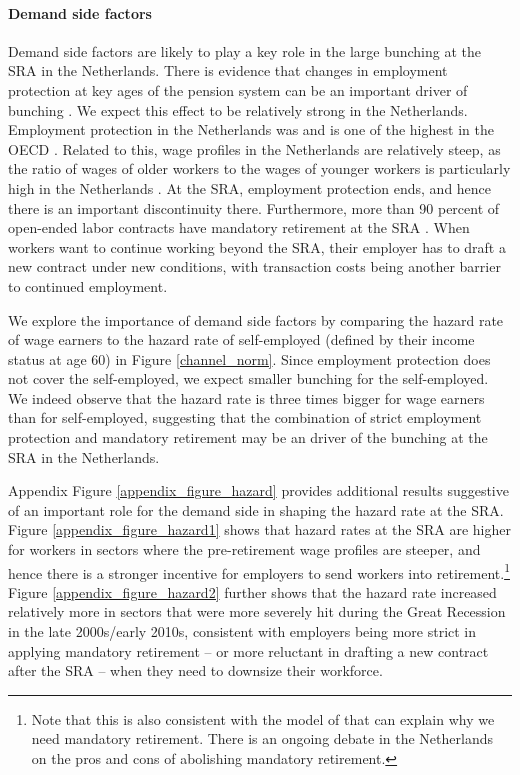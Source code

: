 \documentclass[12pt,a4paper]{article}
\begin{document}
\paragraph{Demand side factors} Demand side factors are likely to play a key role in the large bunching at the SRA in the Netherlands. There is evidence that changes in employment protection at key ages of the pension system can be an important driver of bunching \citep{rabate2019can}. We expect this effect to be relatively strong in the Netherlands. Employment protection in the Netherlands was and is one of the highest in the OECD \citep{oecd_2020}. Related to this, wage profiles in the Netherlands are relatively steep, as the ratio of wages of older workers to the wages of younger workers is particularly high in the Netherlands \citep{oecd_2014}. At the SRA, employment protection ends, and hence there is an important discontinuity there. Furthermore, more than 90 percent of open-ended labor contracts have mandatory retirement at the SRA \citep[92\% in 2014, according to the][]{oecd_2014}. When workers want to continue working beyond the SRA, their employer has to draft a new contract under new conditions, with transaction costs being another barrier to continued employment.

We explore the importance of demand side factors by comparing the hazard rate of wage earners to the hazard rate of self-employed (defined by their income status at age 60) in Figure \ref{channel_norm}. Since employment protection does not cover the self-employed, we expect smaller bunching for the self-employed. We indeed observe that the hazard rate is three times bigger for wage earners than for self-employed, suggesting that the combination of strict employment protection and mandatory retirement may be an driver of the bunching at the SRA in the Netherlands. 

Appendix Figure \ref{appendix_figure_hazard} provides additional results suggestive of an important role for the demand side in shaping the hazard rate at the SRA. Figure \ref{appendix_figure_hazard1} shows that hazard rates at the SRA are higher for workers in sectors where the pre-retirement wage profiles are steeper, and hence there is a stronger incentive for employers to send workers into retirement.\footnote{Note that this is also consistent with the model of \cite{lazear1979there} that can explain why we need mandatory retirement. There is an ongoing debate in the Netherlands on the pros and cons of abolishing mandatory retirement.} Figure \ref{appendix_figure_hazard2} further shows that the hazard rate increased relatively more in sectors that were more severely hit during the Great Recession in the late 2000s/early 2010s, consistent with employers being more strict in applying mandatory retirement -- or more reluctant in drafting a new contract after the SRA -- when they need to downsize their workforce.
\end{document}
